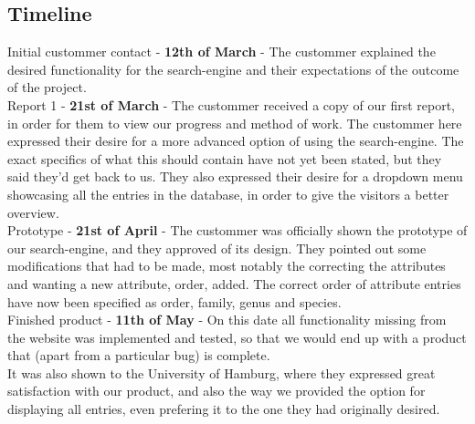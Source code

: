 \documentclass[12pt,a4paper]{article}
\begin{document}
\subsection{Timeline}

	Initial custommer contact - {\bf 12th of March} - The custommer explained the desired functionality for the search-engine and their expectations of the outcome of the project. \\
	
	
	Report 1 - {\bf 21st of March} - The custommer received a copy of our first report, in order for them to view our progress and method of work.
	The custommer here expressed their desire for a more advanced option of using the search-engine. The exact specifics of what this should contain have not yet been stated, but they said they'd get back to us.
	They also expressed their desire for a dropdown menu showcasing all the entries in the database, in order to give the visitors a better overview.\\
	
	
	Prototype - {\bf 21st of April} - The custommer was officially shown the prototype of our search-engine, and they approved of its design. They pointed out some modifications that had to be made, most notably the correcting the attributes and wanting a new attribute, order, added. The correct order of attribute entries have now been specified as order, family, genus and species.\\
	
	Finished product - {\bf 11th of May} - On this date all functionality missing from the website was implemented and tested, so that we would end up with a product that (apart from a particular bug) is complete.\\
	It was also shown to the University of Hamburg, where they expressed great satisfaction with our product, and also the way we provided the option for displaying all entries, even prefering it to the one they had originally desired.\\
\end{document}
